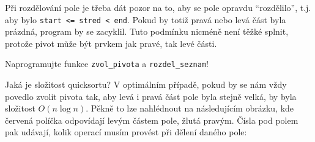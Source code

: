 \begin{remark*} Při rozdělování pole je třeba dát pozor na to, aby se pole opravdu ``rozdělilo'', t.j.
aby bylo {\tt start <= stred < end}. Pokud by totiž pravá nebo levá část byla prázdná, program 
by se zacyklil. Tuto podmínku nicméně není těžké splnit, protože pivot může být prvkem jak pravé,
tak levé části.
\end{remark*}

\begin{cviceni} Naprogramujte funkce {\tt zvol\_pivota} a {\tt rozdel\_seznam}!
\end{cviceni}

Jaká je složitost quicksortu? V optimálním případě, pokud by se nám vždy povedlo zvolit pivota tak, aby levá i pravá část
pole byla stejně velká, by byla složitost $O(n\log n)$. Pěkně to lze nahlédnout na následujícím obrázku, kde červená políčka
odpovídají levým částem pole, žlutá pravým. Čísla pod polem pak udávají, kolik operací musím provést při dělení daného pole:
